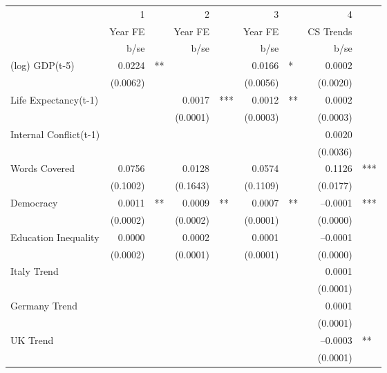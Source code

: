 \begin{tabular} {l* {4}{r @{} l}}
\hline
            &           1&   &           2&   &           3&   &           4&   \\
            &     Year FE&   &     Year FE&   &     Year FE&   &   CS Trends&   \\
            &        b/se&   &        b/se&   &        b/se&   &        b/se&   \\
\hline
(log) GDP(t-5)&      0.0224&** &            &   &      0.0166&*  &      0.0002&   \\
            &    (0.0062)&   &            &   &    (0.0056)&   &    (0.0020)&   \\
Life Expectancy(t-1) &            &   &      0.0017&***&      0.0012&** &      0.0002&   \\
            &            &   &    (0.0001)&   &    (0.0003)&   &    (0.0003)&   \\
Internal Conflict(t-1)&            &   &            &   &            &   &      0.0020&   \\
            &            &   &            &   &            &   &    (0.0036)&   \\
Words Covered&      0.0756&   &      0.0128&   &      0.0574&   &      0.1126&***\\
            &    (0.1002)&   &    (0.1643)&   &    (0.1109)&   &    (0.0177)&   \\
Democracy   &      0.0011&** &      0.0009&** &      0.0007&** &    --0.0001&***\\
            &    (0.0002)&   &    (0.0002)&   &    (0.0001)&   &    (0.0000)&   \\
Education Inequality&      0.0000&   &      0.0002&   &      0.0001&   &    --0.0001&   \\
            &    (0.0002)&   &    (0.0001)&   &    (0.0001)&   &    (0.0000)&   \\
Italy Trend &            &   &            &   &            &   &      0.0001&   \\
            &            &   &            &   &            &   &    (0.0001)&   \\
Germany Trend&            &   &            &   &            &   &      0.0001&   \\
            &            &   &            &   &            &   &    (0.0001)&   \\
UK Trend    &            &   &            &   &            &   &    --0.0003&** \\
            &            &   &            &   &            &   &    (0.0001)&   \\

\end{tabular}

